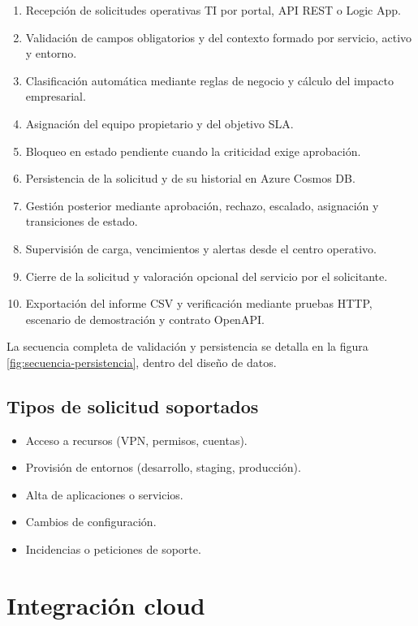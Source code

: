 \begin{enumerate}
    \item Recepción de solicitudes operativas TI por portal, API REST o Logic App.
    \item Validación de campos obligatorios y del contexto formado por servicio, activo y entorno.
    \item Clasificación automática mediante reglas de negocio y cálculo del impacto empresarial.
    \item Asignación del equipo propietario y del objetivo SLA.
    \item Bloqueo en estado pendiente cuando la criticidad exige aprobación.
    \item Persistencia de la solicitud y de su historial en Azure Cosmos DB.
    \item Gestión posterior mediante aprobación, rechazo, escalado, asignación y transiciones de estado.
    \item Supervisión de carga, vencimientos y alertas desde el centro operativo.
    \item Cierre de la solicitud y valoración opcional del servicio por el solicitante.
    \item Exportación del informe CSV y verificación mediante pruebas HTTP, escenario de demostración y contrato OpenAPI.
\end{enumerate}

La secuencia completa de validación y persistencia se detalla en la figura \ref{fig:secuencia-persistencia}, dentro del diseño de datos.

\subsection{Tipos de solicitud soportados}

\begin{itemize}
    \item Acceso a recursos (VPN, permisos, cuentas).
    \item Provisión de entornos (desarrollo, staging, producción).
    \item Alta de aplicaciones o servicios.
    \item Cambios de configuración.
    \item Incidencias o peticiones de soporte.
\end{itemize}

\section{Integración cloud}

